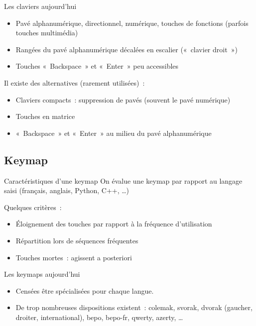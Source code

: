 \begin{frame}{Les claviers aujourd’hui}
  \begin{itemize}
    \item Pavé alphanumérique, directionnel, numérique, touches de fonctions
      (parfois touches multimédia) \pause

    \item Rangées du pavé alphanumérique décalées en escalier («~clavier
      droit~») \pause

    \item Touches «~Backspace~» et «~Enter~» peu accessibles \pause
  \end{itemize}

  Il existe des alternatives (rarement utilisées)~: \pause
  \begin{itemize}
    \item Claviers compacts~: suppression de pavés (souvent le pavé numérique)
      \pause

    \item Touches en matrice \pause

    \item «~Backspace~» et «~Enter~» au milieu du pavé alphanumérique
  \end{itemize}
\end{frame}



\subsection{Keymap}

\begin{frame}{Caractéristiques d’une keymap}
  On évalue une keymap par rapport au langage saisi (français, anglais, Python,
  C++, …) \pause

  Quelques critères~:
  \begin{itemize}
    \item Éloignement des touches par rapport à la fréquence d’utilisation
      \pause

    \item Répartition lors de séquences fréquentes \pause

    \item Touches mortes~: agissent a posteriori
  \end{itemize}
\end{frame}

\begin{frame}{Les keymaps aujourd’hui}
  \begin{itemize}
    \item Censées être spécialisées pour chaque langue. \pause

    \item De trop nombreuses dispositions existent~: colemak, svorak, dvorak
      (gaucher, droiter, international), bepo, bepo-fr, qwerty, azerty, …
  \end{itemize}
\end{frame}
